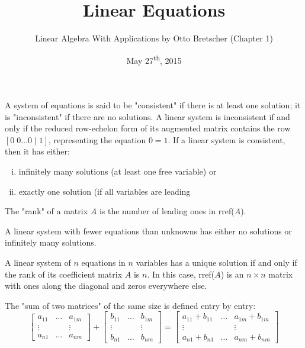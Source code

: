 \documentclass[a4paper,11pt]{article}
\title{Linear Equations}
\author{Linear Algebra With Applications by Otto Bretscher (Chapter 1)}
\date{May 27\textsuperscript{th}, 2015}
\begin{document}
\maketitle
{}

\begin{outline}

    A system of equations is said to be "consistent" if there is at least one solution; it is "inconsistent" 
    if there are no solutions. A linear system is inconsistent if and only if the reduced row-echelon form
    of its augmented matrix contains the row \([0\; 0 \ldots 0\; \vert\; 1]\), representing the equation \(0 = 1\). 
    If a linear system is consistent, then it has either:
    \begin{enumerate}[i.]
      \item infinitely many solutions (at least one free variable) or
      \item exactly one solution (if all variables are leading
    \end{enumerate}
    
    The "rank" of a matrix \(A\) is the number of leading ones in rref(\(A\)).
    
    A linear system with fewer equations than unknowns has either no solutions or infinitely many solutions.

    A linear system of \(n\) equations in \(n\) variables has a unique solution if and only if the rank of its 
    coefficient matrix \(A\) is \(n\). In this case, rref(\(A\)) is an \(n \times n\) matrix with ones along the 
    diagonal and zeros everywhere else.
      
    The "sum of two matrices" of the same size is defined entry by entry:
    \[
      \begin{bmatrix} a_{11} & \ldots & a_{1m} \\ \vdots & & \vdots \\ a_{n1} & \ldots & a_{nm} \end{bmatrix} +
      \begin{bmatrix} b_{11} & \ldots & b_{1m} \\ \vdots & & \vdots \\ b_{n1} & \ldots & b_{nm} \end{bmatrix} =
      \begin{bmatrix}
        a_{11} + b_{11} & \ldots & a_{1m} + b_{1m} \\
        \vdots          &        & \vdots          \\
        a_{n1} + b_{n1} & \ldots & a_{nm} + b_{nm} 
      \end{bmatrix}
    \]
      

\end{outline}
\end{document}
